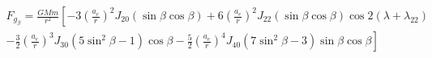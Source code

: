 \documentclass[10pt]{article}
\begin{document}
\begin{align*}F_{g_{\beta}}
= \frac{GMm}{r^2} 
\left[ 
- 3 \left( \frac{a_{e}}{r} \right)^2 J_{20} \left( \sin \beta \cos \beta \right)
+ 6 \left( \frac{a_{e}}{r} \right)^2 J_{22} \left( \sin \beta \cos \beta \right) \cos 2 \left( \lambda + \lambda_{22} \right)
\right.
\\
\left.
- \frac{3}{2} \left( \frac{a_{e}}{r} \right)^3 J_{30} \left( 5 \sin^2 \beta - 1 \right) \cos \beta
- \frac{5}{2} \left( \frac{a_{e}}{r} \right)^4 J_{40} \left( 7 \sin^2 \beta - 3 \right) \sin \beta \cos \beta
\right]\end{align*}
\end{document}
